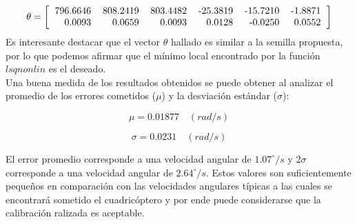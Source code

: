 \documentclass[main]{subfiles}
\begin{document}
\begin{equation}
\theta=\left[\begin{tabular}{rrrrrr}
 796.6646 & 808.2419 & 803.4482 & -25.3819 & -15.7210 & -1.8871 \\
 0.0093 & 0.0659 & 0.0093 & 0.0128 & -0.0250 & 0.0552  \end{tabular}\right]
\end{equation}
Es interesante destacar que el vector $\theta$ hallado es similar a la semilla propuesta, por lo que podemos afirmar que el mínimo local encontrado por la función $lsqnonlin$ es el deseado.\\

Una buena medida de los resultados obtenidos se puede obtener al analizar el promedio de los errores cometidos ($\mu$) y la desviación estándar ($\sigma$):

\begin{equation}
\mu=0.01877 \quad (rad/s)
\label{ec:mu_gyro}
\end{equation}

\begin{equation}
\sigma=0.0231 \quad (rad/s)
\label{ec:sigma_gyro}
\end{equation}

El error promedio corresponde a una velocidad angular de $1.07^\circ/s$ y $2\sigma$ corresponde a una velocidad angular de $2.64^\circ/s$. Estos valores son suficientemente pequeños en comparaci\'on con las velocidades angulares t\'ipicas a las cuales se encontrar\'a sometido el cuadric\'optero y por ende puede considerarse que la calibraci\'on ralizada es aceptable.
\end{document}
